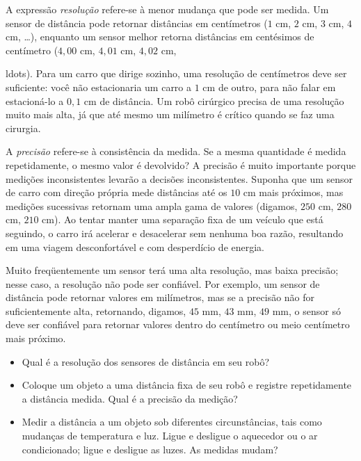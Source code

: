 A expressão \emph{resolução} refere-se à menor mudança que pode ser medida. Um sensor de distância pode retornar distâncias em centímetros ($1$ cm, $2$ cm, $3$ cm, $4$ cm, \ldots), enquanto um sensor melhor retorna distâncias em centésimos de centímetro ($4,00$ cm, $4,01$ cm, $4,02$ cm, {ldots). Para um carro que dirige sozinho, uma resolução de centímetros deve ser suficiente: você não estacionaria um carro a $1$ cm de outro, para não falar em estacioná-lo a $0,1$ cm de distância. Um robô cirúrgico precisa de uma resolução muito mais alta, já que até mesmo um milímetro é crítico quando se faz uma cirurgia.

A \emph{precisão} refere-se à consistência da medida. Se a mesma quantidade é medida repetidamente, o mesmo valor é devolvido? A precisão é muito importante porque medições inconsistentes levarão a decisões inconsistentes. Suponha que um sensor de carro com direção própria mede distâncias até os $10$ cm mais próximos, mas medições sucessivas retornam uma ampla gama de valores (digamos, $250$ cm, $280$ cm, $210$ cm). Ao tentar manter uma separação fixa de um veículo que está seguindo, o carro irá acelerar e desacelerar sem nenhuma boa razão, resultando em uma viagem desconfortável e com desperdício de energia.

Muito freqüentemente um sensor terá uma alta resolução, mas baixa precisão; nesse caso, a resolução não pode ser confiável. Por exemplo, um sensor de distância pode retornar valores em milímetros, mas se a precisão não for suficientemente alta, retornando, digamos, $45$ mm, $43$ mm, $49$ mm, o sensor só deve ser confiável para retornar valores dentro do centímetro ou meio centímetro mais próximo.

\begin{framed}
\begin{itemize}
\item Qual é a resolução dos sensores de distância em seu robô?
\item Coloque um objeto a uma distância fixa de seu robô e registre repetidamente a distância medida. Qual é a precisão da medição?
\item Medir a distância a um objeto sob diferentes circunstâncias, tais como mudanças de temperatura e luz. Ligue e desligue o aquecedor ou o ar condicionado; ligue e desligue as luzes. As medidas mudam?
\end{itemize}
\end{framed}

}
